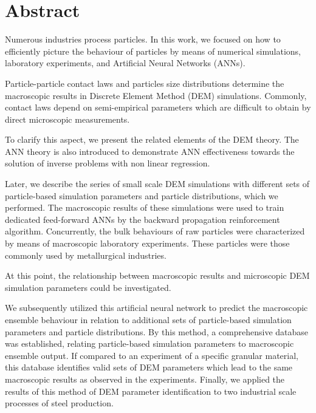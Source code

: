 \chapter*{Abstract}
\label{cap:abstract}

Numerous industries process particles.
In this work, we focused on how to efficiently picture the behaviour of
particles by means of numerical simulations, laboratory experiments, 
and Artificial Neural Networks (ANNs).

Particle-particle contact laws and particles size distributions determine the
macroscopic results in Discrete Element Method (DEM) simulations. 
Commonly, contact laws depend on semi-empirical parameters which 
are difficult to obtain by direct microscopic measurements. 

To clarify this aspect, we present the related elements of the DEM
theory.
The ANN theory is also introduced to demonstrate ANN effectiveness towards
the solution of inverse problems with non linear regression.

Later, we describe the series of small scale DEM simulations with different sets
of particle-based simulation parameters and particle distributions, which we
performed.
The macroscopic results of these simulations were used to train dedicated
feed-forward ANNs by the backward propagation reinforcement algorithm.
Concurrently, the bulk behaviours of raw particles were characterized by means
of macroscopic laboratory experiments. These particles were those commonly used
by metallurgical industries.

At this point, the relationship between macroscopic results and microscopic DEM
simulation parameters could be investigated.

We subsequently utilized this artificial neural network to predict the
macroscopic ensemble behaviour in relation to additional sets of particle-based simulation parameters and particle distributions. 
By this method, a comprehensive database was established, relating particle-based 
simulation parameters to macroscopic ensemble output.
If compared to an experiment of a specific granular material, this database identifies 
valid sets of DEM parameters which lead to the same macroscopic results as observed in the experiments.
Finally, we applied the results of this method of DEM parameter identification
to two industrial scale processes of steel production.

